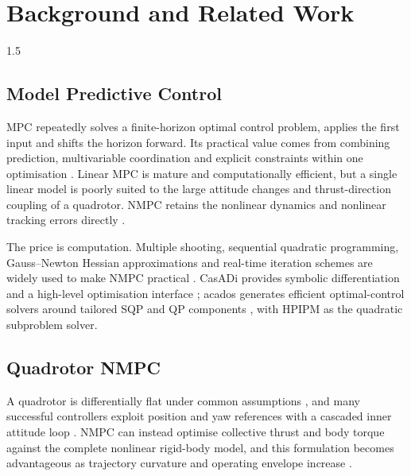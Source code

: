 
\chapter{Background and Related Work}
\label{ch:literature}
\begin{spacing}{1.5}
\setlength{\parskip}{0.22in}

\section{Model Predictive Control}

MPC repeatedly solves a finite-horizon optimal control problem, applies the first
input and shifts the horizon forward. Its practical value comes from combining
prediction, multivariable coordination and explicit constraints within one
optimisation \cite{rawlings2017mpc,mayne2014mpc}. Linear MPC is mature and
computationally efficient, but a single linear model is poorly suited to the
large attitude changes and thrust-direction coupling of a quadrotor. NMPC retains
the nonlinear dynamics and nonlinear tracking errors directly
\cite{grune2017nmpc}.

The price is computation. Multiple shooting, sequential quadratic programming,
Gauss--Newton Hessian approximations and real-time iteration schemes are widely
used to make NMPC practical \cite{diehl2005rti}. CasADi provides symbolic
differentiation and a high-level optimisation interface
\cite{andersson2019casadi}; acados generates efficient optimal-control solvers
around tailored SQP and QP components \cite{acados}, with
HPIPM \cite{hpipm} as the quadratic subproblem solver.

\section{Quadrotor NMPC}

A quadrotor is differentially flat under common assumptions \cite{mellinger2011},
and many successful controllers exploit position and yaw references with a
cascaded inner attitude loop \cite{lee2010}. NMPC can instead optimise collective
thrust and body torque against the complete nonlinear rigid-body model, and this
formulation becomes advantageous as trajectory curvature and operating envelope
increase \cite{kamel2017linear,foehn2021}.


\end{spacing}
